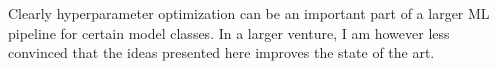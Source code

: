 \documentclass[11pt]{diazessay}
\begin{document}
Clearly hyperparameter optimization can be an important part of a larger ML pipeline for certain model classes. In a larger venture, I am however less convinced that the ideas presented here improves the state of the art.





\end{document}
